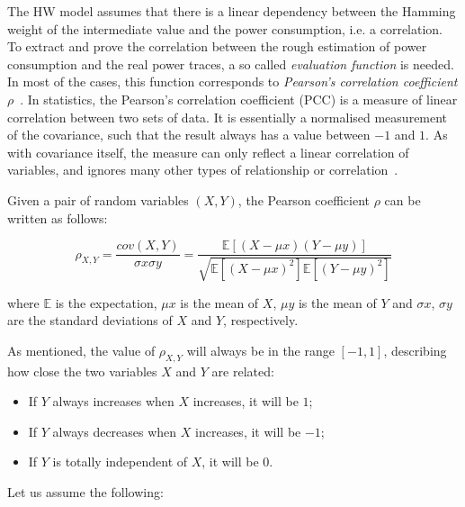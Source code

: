             

            The HW model assumes that there is a linear dependency between the Hamming weight of the intermediate value and the power consumption, i.e. a correlation. To extract and prove the correlation between the rough estimation of power consumption and the real power traces, a so called \emph{evaluation function} is needed. In most of the cases, this function corresponds to \emph{Pearson's correlation coefficient} $\rho$~\cite{sakiyama2016security}. In statistics, the Pearson's correlation coefficient (PCC) is a measure of linear correlation between two sets of data. It is essentially a normalised measurement of the covariance, such that the result always has a value between $-1$ and $1$. As with covariance itself, the measure can only reflect a linear correlation of variables, and ignores many other types of relationship or correlation~\cite{wikipearson}. 

            \noindent Given a pair of random variables $(X,Y)$, the Pearson coefficient $\rho$ can be written as follows:

            \begin{equation}
                \rho_{X,Y} = \frac{cov(X,Y)}{\sigma x \sigma y} = \frac{\mathbb{E}[(X - \mu x)(Y - \mu y)]}{\sqrt{\mathbb{E}[(X - \mu x)^2] \mathbb{E}[(Y - \mu y)^2]}}
            \end{equation}

            where $\mathbb{E}$ is the expectation, $\mu x$ is the mean of $X$, $\mu y$ is the mean of $Y$ and $\sigma x$, $\sigma y$ are the standard deviations of $X$ and $Y$, respectively.

            As mentioned, the value of $\rho_{X,Y}$ will always be in the range $[-1, 1]$, describing how close the two variables $X$ and $Y$ are related:

            \begin{itemize}
                \item If $Y$ always increases when $X$ increases, it will be $1$;
                \item If $Y$ always decreases when $X$ increases, it will be $-1$;
                \item If $Y$ is totally independent of $X$, it will be $0$.
            \end{itemize}

            \noindent Let us assume the following:
            
